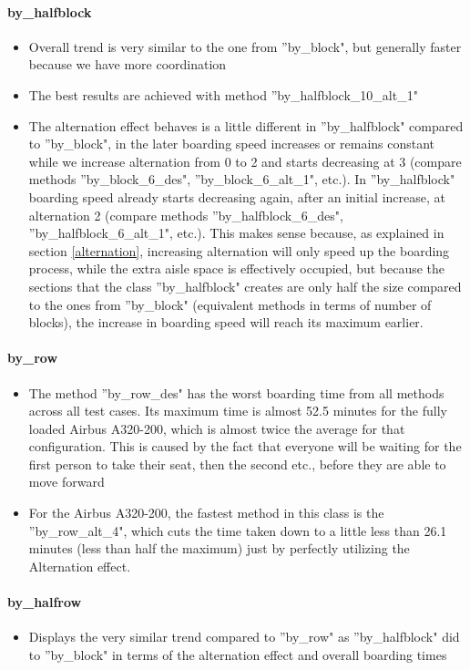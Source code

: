 \documentclass[11pt]{article}
\begin{document}
 \paragraph{by\_halfblock}
 \begin{itemize}
 	\item Overall trend is very similar to the one from ''by\_block", but generally faster because we have more coordination
 	\item The best results are achieved with method ''by\_halfblock\_10\_alt\_1"
 	\item The alternation effect behaves is a little different in ''by\_halfblock" compared to ''by\_block", in the later boarding speed increases or remains constant while we increase alternation from 0 to 2 and starts decreasing at 3 (compare methods ''by\_block\_6\_des", ''by\_block\_6\_alt\_1", etc.). In ''by\_halfblock" boarding speed already starts decreasing again, after an initial increase, at alternation 2 (compare methods ''by\_halfblock\_6\_des", ''by\_halfblock\_6\_alt\_1", etc.). This makes sense because, as explained in section \ref{alternation}, increasing alternation will only speed up the boarding process, while the extra aisle space is effectively occupied, but because the sections that the class ''by\_halfblock" creates are only half the size compared to the ones from ''by\_block" (equivalent methods in terms of number of blocks), the increase in boarding speed will reach its maximum earlier. 
 \end{itemize}
 \paragraph{by\_row}
 \begin{itemize}
 	\item The method ''by\_row\_des" has the worst boarding time from all methods across all test cases. Its maximum time is almost 52.5 minutes for the fully loaded Airbus A320-200, which is almost twice the average for that configuration. This is caused by the fact that everyone will be waiting for the first person to take their seat, then the second etc., before they are able to move forward
 	\item For the Airbus A320-200, the fastest method in this class is the ''by\_row\_alt\_4", which cuts the time taken down to a little less than 26.1 minutes (less than half the maximum) just by perfectly utilizing the Alternation effect.
 \end{itemize}
 
 \paragraph{by\_halfrow}
 \begin{itemize}
 	\item Displays the very similar trend compared to ''by\_row" as ''by\_halfblock" did to ''by\_block" in terms of the alternation effect and overall boarding times
 \end{itemize}
 
\end{document}
